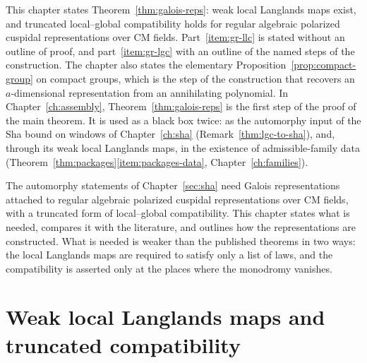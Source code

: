 \documentclass[11pt]{amsbook}
\theoremstyle{plain}
\theoremstyle{definition}
\theoremstyle{remark}
\numberwithin{equation}{section}
\numberwithin{figure}{chapter}
\numberwithin{table}{chapter}
\begin{document}
This chapter states Theorem~\ref{thm:galois-reps}: weak local
Langlands maps exist, and truncated local--global compatibility holds
for regular algebraic polarized cuspidal representations over CM
fields. Part~\ref{item:gr-llc} is stated without an outline of proof,
and part~\ref{item:gr-lgc} with an outline of the named steps of the
construction. The chapter also states the elementary
Proposition~\ref{prop:compact-group} on compact groups, which is the
step of the construction that recovers an $a$-dimensional
representation from an annihilating polynomial. In
Chapter~\ref{ch:assembly}, Theorem~\ref{thm:galois-reps} is the first
step of the proof of the main theorem. It is used as a black box
twice: as the automorphy input of the Sha bound on windows of
Chapter~\ref{ch:sha} (Remark~\ref{thm:lgc-to-sha}), and, through its
weak local Langlands maps, in the existence of admissible-family data
(Theorem~\ref{thm:packages}\ref{item:packages-data},
Chapter~\ref{ch:families}).

The automorphy statements of Chapter~\ref{sec:sha} need Galois
representations attached to regular algebraic polarized cuspidal
representations over CM fields, with a truncated form of local--global
compatibility. This chapter states what is needed, compares it with
the literature, and outlines how the representations are constructed.
What is needed is weaker than the published theorems in two ways: the
local Langlands maps are required to satisfy only a list of laws, and
the compatibility is asserted only at the places where the monodromy
vanishes.

\section{Weak local Langlands maps and truncated compatibility}
\end{document}
